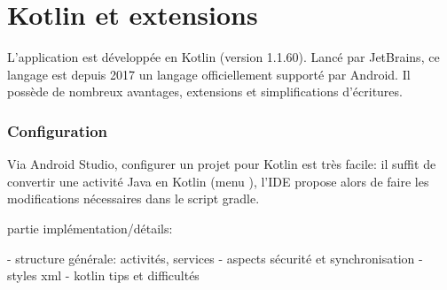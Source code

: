 
\section{Kotlin et extensions}

L'application est développée en Kotlin (version 1.1.60). Lancé par JetBrains, ce langage est depuis 2017 un langage officiellement supporté par Android. Il possède de nombreux avantages, extensions et simplifications d'écritures.

\subsubsection*{Configuration}
Via Android Studio, configurer un projet pour Kotlin est très facile: il suffit de convertir une activité Java en Kotlin (menu ), l'IDE propose alors de faire les modifications nécessaires dans le script gradle.


partie implémentation/détails:

- structure générale: activités, services
- aspects sécurité et synchronisation
- styles xml 
- kotlin tips et difficultés